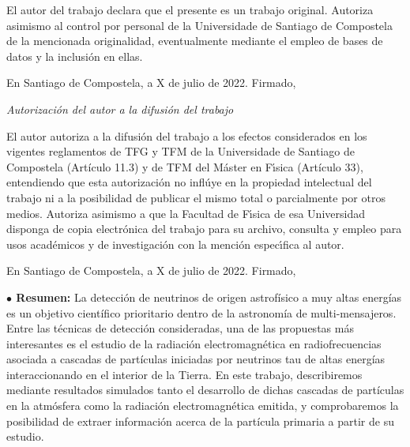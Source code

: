 \documentclass[11 pt, a4paper]{article} %
\numberwithin{equation}{section}
\numberwithin{figure}{section}
\numberwithin{table}{section}
\begin{document}
	El autor del trabajo declara que el presente es un trabajo original. Autoriza asimismo al control por personal de la Universidade de Santiago de Compostela de la mencionada originalidad, eventualmente mediante el empleo de bases de datos y la inclusi\'on en ellas.
	
	En Santiago de Compostela, a X de julio de 2022. Firmado,\vspace{3cm}
	
	
	{\sl Autorizaci\'on del autor a la difusi\'on del trabajo}
	
	 El autor autoriza a la difusi\'on del trabajo a los efectos considerados en los vigentes reglamentos de TFG y TFM de la Universidade de Santiago de Compostela (Artículo 11.3) y de TFM del M\'aster en F\'{\i}sica (Artículo 33), entendiendo que esta autorizaci\'on no infl\'uye en la propiedad intelectual del trabajo ni a la posibilidad de publicar el mismo total o parcialmente por otros medios. Autoriza asimismo a que la Facultad de F\'{\i}sica de esa Universidad disponga de copia electr\'onica del trabajo para su archivo, consulta y empleo para usos acad\'emicos y de investigaci\'on con la menci\'on espec\'{\i}fica al autor. 
	
	En Santiago de Compostela, a X de julio de 2022. Firmado,\
	
	\thispagestyle{empty}
	\pagebreak

	\thispagestyle{empty} %
	\pagebreak
	
		\begin{flushleft}  {\bf $\bullet$ Resumen:\;\;}
		La detección de neutrinos de origen astrofísico a muy altas energías es un objetivo científico prioritario dentro de la astronomía de multi-mensajeros. Entre las técnicas de detección consideradas, una de las propuestas más interesantes es el estudio de la radiación electromagnética en radiofrecuencias asociada a cascadas de partículas iniciadas por neutrinos tau de altas energías interaccionando en el interior de la Tierra. En este trabajo, describiremos mediante resultados simulados tanto el desarrollo de dichas cascadas de partículas en la atmósfera como la radiación electromagnética emitida, y comprobaremos la posibilidad de extraer información acerca de la partícula primaria a partir de su estudio.
	\end{flushleft}\mbox{}
\end{document}

